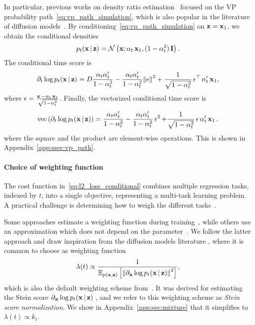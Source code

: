 In particular, previous works on density ratio estimation~\citet{Rhodes2020,choi2022densityratio} focused on the VP probability path~\eqref{eq:vp_path_simulation}, which is also popular in the literature of diffusion models~\citep{sohl-dickstein2015deep,ho2020ddpm,song2021sde}. By conditioning~\eqref{eq:vp_path_simulation} on $\operatorname{\mathbf{z}}=\operatorname{\mathbf{x}}_{1}$, we obtain the conditional densities
\begin{align}
    p_{t}(\operatorname{\mathbf{x}}|\operatorname{\mathbf{z}}) 
    = 
    \mathcal{N} \left(\operatorname{\mathbf{x}};\alpha_{t}\operatorname{\mathbf{x}}_{1},(1-\alpha_{t}^{2}) \operatorname{\mathbf{I}}\right).
\end{align}
The conditional time score is
\begin{align}
    \partial_{t}\log p_{t}(\operatorname{\mathbf{x}}|\operatorname{\mathbf{z}}) 
    = 
    D\frac{\alpha_{t}\alpha'_{t}}{1-\alpha_{t}^{2}} - \frac{\alpha_{t}\alpha'_{t}}{1-\alpha_{t}^{2}}\norm{\operatorname{\mathbf{\epsilon}}}^{2}
    + \frac{1}{\sqrt{1-\alpha_{t}^{2}}}\operatorname{\mathbf{\epsilon}}^{\top}\alpha'_{t}\operatorname{\mathbf{x}}_{1},
\end{align}
where $\operatorname{\mathbf{\epsilon}} = \frac{\operatorname{\mathbf{x}}-\alpha_{t}\operatorname{\mathbf{x}}_{1}}{\sqrt{1-\alpha_{t}^{2}}}$. Finally, the vectorized conditional time score is
\begin{align}
    {\text{vec}}\left(\partial_{t}\log p_{t}(\operatorname{\mathbf{x}}|\operatorname{\mathbf{z}})\right) 
    = 
    \frac{\alpha_{t}\alpha'_{t}}{1-\alpha_{t}^{2}} - \frac{\alpha_{t}\alpha'_{t}}{1-\alpha_{t}^{2}}\operatorname{\mathbf{\epsilon}}^{2}
    + \frac{1}{\sqrt{1-\alpha_{t}^{2}}}\operatorname{\mathbf{\epsilon}}\alpha'_{t}\operatorname{\mathbf{x}}_{1}.
\end{align}
where the square and the product are element-wise operations. This is shown in Appendix~\ref{app:ssec:vp_path}. 







\paragraph{Choice of weighting function}

The cost function in~\ref{eq:l2_loss_conditional} combines multiple regression tasks, indexed by $t$, into a single objective, representing a multi-task learning problem. A practical challenge is determining how to weigh the different tasks~\citep{ruder2017multitask,Rhodes2020}.

Some approaches estimate a weighting function during training~\citep{kendall2017multitaskweights,nichol2021diffusion,choi2022densityratio,kingma2023diffusion}, 
while others use an approximation which does not depend on the parameter~\citep{song2021sde,tong2024schrodingerbridge}. We follow the latter approach and draw inspiration from the diffusion models literature \citep{ho2020ddpm,song2021sde}, where it is common to choose as weighting function 
\begin{align}
    \label{eq:path_var}
    \lambda(t)
    \propto \frac{1}{\mathbb{E}_{p(\operatorname{\mathbf{x}}, \operatorname{\mathbf{z}})}\left[ \norm{\partial_{\operatorname{\mathbf{x}}}\log p_{t}(\operatorname{\mathbf{x}}|\operatorname{\mathbf{z}})}^2 \right]},
\end{align}
which is also the default weighting scheme from~\citet{choi2022densityratio}. It was derived for estimating the Stein score $\partial_{{\bm{x}}} \log p_t(\operatorname{\mathbf{x}} | \operatorname{\mathbf{z}})$ \citep{song2021sde}, and we refer to this weighting scheme as \textit{Stein score normalization}. We show in Appendix~\ref{app:sec:mixture} that it simplifies to $\lambda(t) \propto k_t$.

